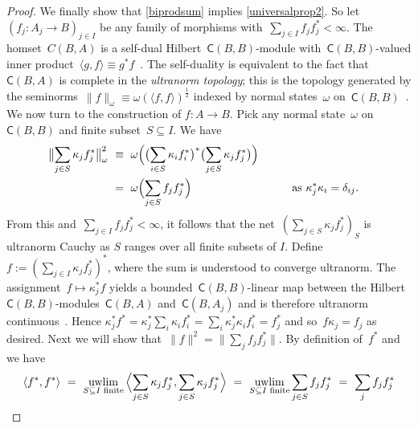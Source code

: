 \documentclass[reqno,T1]{amsproc}
\newcommand{\uwlim}{\qopname\relax m{uwlim}}
\newcommand{\cat}[1]{\mathsf{#1}}		%
\theoremstyle{plain}
\theoremstyle{remark}
\numberwithin{equation}{section}
\begin{document}
\begin{proof}
We finally show that \ref{biprodsum} implies \ref{universalprop2}. So let~$\left(f_j: A_j \to B\right)_{j\in I}$ be any family of morphisms
        with~$\sum_{j \in I}f_jf_j^* < \infty$.
The homset~$C(B,A)$
    is a self-dual Hilbert~$\cat{C}(B,B)$-module
    with~$\cat{C}(B,B)$-valued inner
    product~$\langle g, f\rangle \equiv g^*f$~\cite[2.15]{wstarcat}.
The self-duality is equivalent to the fact
    that~$\cat{C}(B,A)$ is complete in the \emph{ultranorm topology};
    this is the topology
    generated by the seminorms~$\| f \|_\omega \equiv \omega(\langle f,f\rangle)^\frac{1}{2}$
    indexed by normal states~$\omega$ on~$\cat{C}(B,B)$~\cite[\S149\textsubscript{V}]{bas}. We now turn to the construction of $f : A \to B$.
    Pick any normal state~$\omega$ on~$\cat{C}(B,B)$
        and finite subset~$S \subseteq I$.  We have
\begin{alignat*}{2}
    \bigl\| \sum_{j \in S} \kappa_j f_j^* \bigr\|^2_\omega
    &\ \equiv \ 
    \omega\Bigl(\bigl(\sum_{i \in S} \kappa_i f_i^*\bigr)^*
            \bigl(\sum_{j \in S} \kappa_j f_j^*\bigr)\Bigr) \\
    &\ =\ 
    \omega\Bigl( \sum_{j \in S} f_j f_j^*
    \Bigr) &\qquad&\text{as~$\kappa_j^*\kappa_i = \delta_{ij}$}.
\end{alignat*}
From this and~$\sum_{j \in I} f_jf_j^* < \infty$,
    it follows that the net~$\left(\sum_{j \in S} \kappa_j f_j^*\right)_S$
    is ultranorm Cauchy as $S$ ranges over all finite subsets of $I$.
    Define~$f := \left( \sum_{j \in I} \kappa_jf_j^* \right)^*$,
        where the sum is understood to converge ultranorm.
The assignment~$f \mapsto \kappa_j^*f$
    yields a bounded~$\cat{C}(B,B)$-linear map between
    the Hilbert~$\cat{C}(B,B)$-modules~$\cat{C}(B,A)$ and~$\cat{C}(B,A_j)$
    and is therefore ultranorm continuous~\cite[\S148]{bas}.
    Hence
        $\kappa_j^* f^*
             =  \kappa_j^* \sum_{i} \kappa_i f_i^*
             =  \sum_i \kappa_{j }^*\kappa_i f_i^*
            =  f_j^*$
            and so~$f \kappa_j = f_j$ as desired.
Next we will show that~$\|f \|^2 = \|\sum_j f_j f_j^*\|$.
    By definition of~$f^*$ and \cite[\S148\textsubscript{V}]{bas}
         we have~
 \begin{equation*}
         \langle f^*, f^*\rangle
         \ =\  \uwlim_{S\subseteq I\text{ finite}} \, \Bigl\langle \sum_{j \in S} \kappa_j f^*_j,
                        \sum_{j \in S}\kappa_j f^*_j \Bigr\rangle
         \ =\  \uwlim_{S\subseteq I\text{ finite}} \sum_{j \in S} f_j f_j^*
        \ = \ \sum_j f_j f_j^*
 \end{equation*}

\end{proof}
\end{document}
